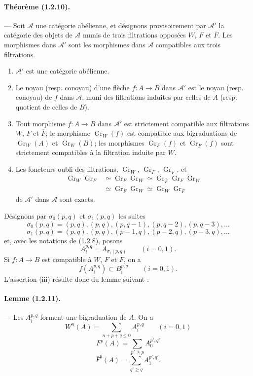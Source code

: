 \documentclass[10pt]{article}
\newcommand{\Gr}{\operatorname{Gr}}
\newcommand{\fg}{\guillemotright}
\newcommand{\og}{\guillemotleft}
\newcommand{\calA}{\mathcal A}
\begin{document}
\paragraph{Théorème (1.2.10).} --- Soit $\calA$ une catégorie abélienne, et désignons provisoirement par $\calA'$ la catégorie des objets de $\calA$ munis de trois filtrations opposées $W$, $F$ et $\overline F$. Les morphismes dans $\calA'$ sont les morphismes dans $\calA$ compatibles aux trois filtrations.
\begin{enumerate}[label=(\roman*)]
\item $\calA'$ est une catégorie abélienne.
\item Le noyau (resp. conoyau) d'une flèche $f:A\to B$ dans $\calA'$ est le noyau (resp. conoyau) de $f$ dans $\calA$, muni des filtrations induites par celles de $A$ (resp. quotient de celles de $B$).
\item Tout morphisme $f:A\to B$ dans $\calA'$ est strictement compatible aux filtrations $W$, $F$ et $\overline F$; le morphisme $\Gr_W(f)$ est compatible aux bigraduations de $\Gr_W(A)$ et $\Gr_W(B)$; les morphismes $\Gr_F(f)$ et $\Gr_{\overline F}(f)$ sont strictement compatibles à la filtration induite par $W$.
\item Les foncteurs \og oubli des filtrations\fg{}, $\Gr_W$, $\Gr_F$, $\Gr_{\overline F}$, et
\[
\begin{aligned}
\Gr_W\Gr_F&\simeq\Gr_F\Gr_W\simeq\Gr_{\overline F}\Gr_F\Gr_W\\
&\simeq\Gr_{\overline F}\Gr_W\simeq\Gr_W\Gr_{\overline F}
\end{aligned}
\]
de $\calA'$ dans $\calA$ sont exacts.
\end{enumerate}

Désignons par $\sigma_0(p,q)$ et $\sigma_1(p,q)$ les suites
\[
\sigma_0(p,q)=(p,q),(p,q),(p,q-1),(p,q-2),(p,q-3),\ldots
\]
\[
\sigma_1(p,q)=(p,q),(p,q),(p-1,q),(p-2,q),(p-3,q),\ldots
\]
et, avec les notations de (1.2.8), posons
\[
A_i^{p,q}=A_{\sigma_i(p,q)}\qquad(i=0,1).
\]
Si $f:A\to B$ est compatible à $W$, $F$ et $\overline F$, on a
\[
\tag{1.2.10.1}
f(A_i^{p,q})\subset B_i^{p,q}\qquad(i=0,1).
\]
L'assertion (iii) résulte donc du lemme suivant :

\paragraph{Lemme (1.2.11).} --- Les $A_i^{p,q}$ forment une bigraduation de $A$. On a
\[
\tag{1.2.11.1}
W^n(A)=\sum_{n+p+q\le0} A_i^{p,q}\qquad(i=0,1)
\]
\[
\tag{1.2.11.2}
F^p(A)=\sum_{p'\ge p} A_0^{p',q'}
\]
\[
\tag{1.2.11.3}
\overline F^q(A)=\sum_{q'\ge q} A_1^{p',q'}.
\]
\end{document}
